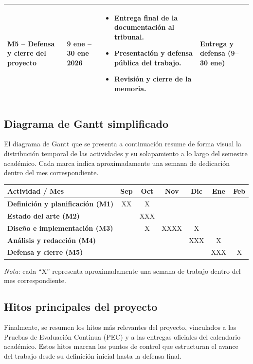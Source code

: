 \documentclass[12pt,a4paper,twoside,openany]{book}
\begin{document}
\begin{longtable}{|>{\bfseries}p{3cm}|p{2.8cm}|p{7.8cm}|p{2.8cm}|}
M5 -- Defensa y cierre del proyecto & 9 ene -- 30 ene 2026 &
\begin{itemize}
\item Entrega final de la documentación al tribunal.
\item Presentación y defensa pública del trabajo.
\item Revisión y cierre de la memoria.
\end{itemize} & Entrega y defensa (9--30 ene) \\ \hline
\end{longtable}

\subsection{Diagrama de Gantt simplificado}

El diagrama de Gantt que se presenta a continuación resume de forma visual la distribución temporal de las actividades y su solapamiento a lo largo del semestre académico. Cada marca indica aproximadamente una semana de dedicación dentro del mes correspondiente.

\begin{center}
\renewcommand{\arraystretch}{1.2}
\begin{tabular}{|>{\bfseries}p{6cm}|c|c|c|c|c|c|}
\hline
Actividad / Mes & Sep & Oct & Nov & Dic & Ene & Feb \\
\hline
Definición y planificación (M1) & XX & X &  &  &  &  \\
\hline
Estado del arte (M2) &  & XXX &  &  &  &  \\
\hline
Diseño e implementación (M3) &  & X & XXXX & X &  &  \\
\hline
Análisis y redacción (M4) &  &  &  & XXX & X &  \\
\hline
Defensa y cierre (M5) &  &  &  &  & XXX & X \\
\hline
\end{tabular}
\end{center}

\noindent
\textit{Nota:} cada ``X'' representa aproximadamente una semana de trabajo dentro del mes correspondiente.


\subsection{Hitos principales del proyecto}

Finalmente, se resumen los hitos más relevantes del proyecto, vinculados a las Pruebas de Evaluación Continua (PEC) y a las entregas oficiales del calendario académico. Estos hitos marcan los puntos de control que estructuran el avance del trabajo desde su definición inicial hasta la defensa final.
\end{document}
